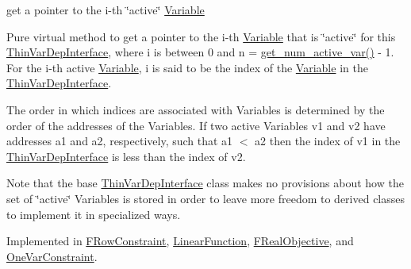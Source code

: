 get a pointer to the i-\/th \char`\"{}active\char`\"{} \mbox{\hyperlink{class_s_m_spp__di__unipi__it_1_1_variable}{Variable}} 

Pure virtual method to get a pointer to the i-\/th \mbox{\hyperlink{class_s_m_spp__di__unipi__it_1_1_variable}{Variable}} that is \char`\"{}active\char`\"{} for this \mbox{\hyperlink{class_s_m_spp__di__unipi__it_1_1_thin_var_dep_interface}{Thin\+Var\+Dep\+Interface}}, where i is between 0 and n = \mbox{\hyperlink{group___thin_var_dep_interface___c_l_a_s_s_e_s_ga6dbf09c17736b358d11f617e15856981}{get\+\_\+num\+\_\+active\+\_\+var()}} -\/ 1. For the i-\/th active \mbox{\hyperlink{class_s_m_spp__di__unipi__it_1_1_variable}{Variable}}, i is said to be the index of the \mbox{\hyperlink{class_s_m_spp__di__unipi__it_1_1_variable}{Variable}} in the \mbox{\hyperlink{class_s_m_spp__di__unipi__it_1_1_thin_var_dep_interface}{Thin\+Var\+Dep\+Interface}}.

The order in which indices are associated with Variables is determined by the order of the addresses of the Variables. If two active Variables v1 and v2 have addresses a1 and a2, respectively, such that a1 $<$ a2 then the index of v1 in the \mbox{\hyperlink{class_s_m_spp__di__unipi__it_1_1_thin_var_dep_interface}{Thin\+Var\+Dep\+Interface}} is less than the index of v2.

Note that the base \mbox{\hyperlink{class_s_m_spp__di__unipi__it_1_1_thin_var_dep_interface}{Thin\+Var\+Dep\+Interface}} class makes no provisions about how the set of \char`\"{}active\char`\"{} Variables is stored in order to leave more freedom to derived classes to implement it in specialized ways. 

Implemented in \mbox{\hyperlink{class_s_m_spp__di__unipi__it_1_1_f_row_constraint_a8599e4f65a8e9750fa7020ff2f50161f}{F\+Row\+Constraint}}, \mbox{\hyperlink{class_s_m_spp__di__unipi__it_1_1_linear_function_a2056982790f3293a03f8cebb2f3b0d93}{Linear\+Function}}, \mbox{\hyperlink{class_s_m_spp__di__unipi__it_1_1_f_real_objective_a1ba10c2bdb196783fa32ab9cae079203}{F\+Real\+Objective}}, and \mbox{\hyperlink{class_s_m_spp__di__unipi__it_1_1_one_var_constraint_a8599e4f65a8e9750fa7020ff2f50161f}{One\+Var\+Constraint}}.

\mbox{\label{group___thin_var_dep_interface___c_l_a_s_s_e_s_ga6dbf09c17736b358d11f617e15856981}} 
